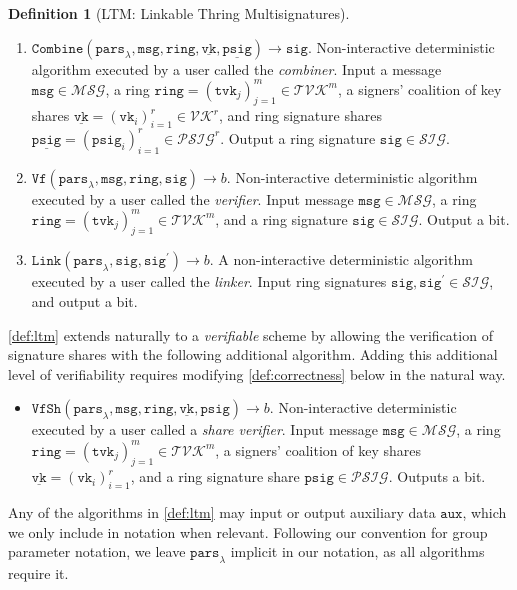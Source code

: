 \documentclass[11pt]{article}
\theoremstyle{definition}
\newtheorem{definition}[definition]{Definition}
\newcommand{\vk}{\texttt{vk}}
\newcommand{\tvk}{\texttt{tvk}}
\newcommand{\ring}{\texttt{ring}}
\newcommand{\VK}{\underline{\texttt{vk}}}
\newcommand{\sig}{\texttt{sig}}
\newcommand{\psig}{\texttt{psig}}
\newcommand{\psigs}{\underline{\texttt{psig}}}
\newcommand{\secpar}{\lambda}
\newcommand{\params}{\texttt{pars}}
\newcommand{\msg}{\texttt{msg}}
\newcommand{\setupO}{\params_\secpar}
\newcommand{\combine}{\texttt{Combine}}
\newcommand{\PSIG}{\underline{\psig}}
\newcommand{\combineIbase}{(\setupO,\msg,\ring,\VK,\PSIG)}
\newcommand{\combineO}{\sig}
\newcommand{\combineIObase}{\combine\combineIbase\to\combineO}
\newcommand{\verify}{\texttt{Vf}}
\newcommand{\verifyI}{(\setupO,\msg,\ring,\sig)}
\newcommand{\verifyO}{b}
\newcommand{\verifyIObase}{\verify\verifyI\to\verifyO}
\newcommand{\link}{\texttt{Link}}
\newcommand{\linkI}{(\setupO,\sig,\sig^\prime)}
\newcommand{\linkO}{\verifyO}
\newcommand{\linkIObase}{\link\linkI\to\linkO}
\newcommand{\verifyshare}{\texttt{VfSh}}
\newcommand{\verifyshareI}{(\setupO,\msg,\ring,\VK,\psig)}
\newcommand{\verifyshareO}{\verifyO}
\newcommand{\verifyshareIObase}{\verifyshare\verifyshareI\to\verifyshareO}
\begin{document}
\begin{definition}[LTM: Linkable Thring Multisignatures]
\begin{enumerate}
\item $\combineIObase$. Non-interactive deterministic algorithm executed by a user called the \textit{combiner}. Input a message $\msg \in \mathcal{MSG}$, a ring $\ring = (\tvk_j)_{j=1}^{m} \in \mathcal{TVK}^m$,  a signers' coalition of key shares $\VK = (\vk_i)_{i=1}^{r} \in \mathcal{VK}^r$,  and ring signature shares $\psigs=(\psig_i)_{i=1}^{r} \in \mathcal{PSIG}^r$. Output a ring signature $\sig \in \mathcal{SIG}$.

\item $\verifyIObase$. Non-interactive deterministic algorithm executed by a user called the \textit{verifier}. Input message $\msg \in \mathcal{MSG}$, a ring  $\ring = (\tvk_j)_{j=1}^{m} \in \mathcal{TVK}^m$, and a ring signature $\sig \in \mathcal{SIG}$. Output a bit.

\item $\linkIObase$. A non-interactive deterministic algorithm executed by a user called the \textit{linker}.  Input ring signatures $\sig, \sig^\prime \in \mathcal{SIG}$, and output a bit.
\end{enumerate}

\end{definition}

\cref{def:ltm} extends naturally to a \textit{verifiable} scheme by allowing the verification of signature shares with the following additional algorithm.
Adding this additional level of verifiability requires modifying \cref{def:correctness} below in the natural way.


\begin{itemize}
\item $\verifyshareIObase$. Non-interactive deterministic executed by a user called a \textit{share verifier}. Input message $\msg \in \mathcal{MSG}$, a ring $\ring = (\tvk_j)_{j=1}^{m} \in \mathcal{TVK}^m$, a signers' coalition of key shares $\VK=(\vk_i)_{i=1}^{r}$, and a ring signature share $\psig \in \mathcal{PSIG}$. Outputs a bit.
\end{itemize}

Any of the algorithms in \cref{def:ltm} may input or output auxiliary data $\texttt{aux}$, which we only include in notation when relevant. Following our convention for group parameter notation, we leave $\params_\secpar$ implicit in our notation, as all algorithms require it.
\end{document}
